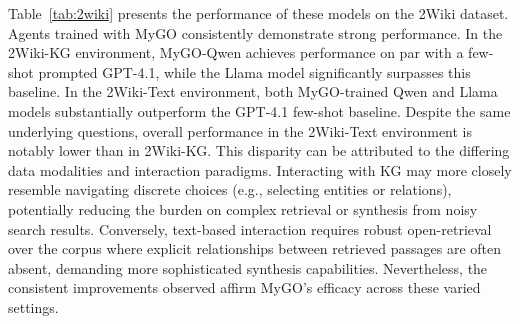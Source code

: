 \begin{table}[h]
\centering %
\renewcommand{\arraystretch}{1.1} %
\caption{Comparative Performance of Models on 2Wiki-KG and 2Wiki-Text Environments.}
\label{tab:2wiki} 
\end{table}

Table~\ref{tab:2wiki} presents the performance of these models on the 2Wiki dataset.
Agents trained with MyGO consistently demonstrate strong performance.
In the 2Wiki-KG environment, MyGO-Qwen achieves performance on par with a few-shot prompted GPT-4.1, while the Llama model significantly surpasses this baseline.
In the 2Wiki-Text environment, both MyGO-trained Qwen and Llama models substantially outperform the GPT-4.1 few-shot baseline.
Despite the same underlying questions, overall performance in the 2Wiki-Text environment is notably lower than in 2Wiki-KG.
This disparity can be attributed to the differing data modalities and interaction paradigms.
Interacting with KG may more closely resemble navigating discrete choices (e.g., selecting entities or relations), potentially reducing the burden on complex retrieval or synthesis from noisy search results.
Conversely, text-based interaction requires robust open-retrieval over the corpus where explicit relationships between retrieved passages are often absent, demanding more sophisticated synthesis capabilities.
Nevertheless, the consistent improvements observed affirm MyGO's efficacy across these varied settings.

